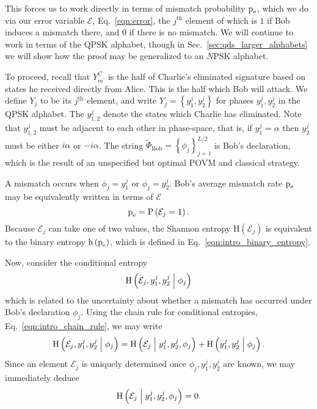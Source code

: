 This forces us to work directly in terms of mismatch probability $\text{p}_{\text{e}}$, which we do via our error variable $\mathcal{E}$, Eq.~\ref{eqn:error}, the $j^{\text{th}}$ element of which is $1$ if Bob induces a mismatch there, and $0$ if there is no mismatch. We will continue to work in terms of the QPSK alphabet, though in Sec.~\ref{sec:qds_larger_alphabets} we will show how the proof may be generalized to an $N$PSK alphabet.

To proceed, recall that $Y_{m^\prime}^C$ is the half of Charlie's eliminated signature based on states he received directly from Alice. This is the half which Bob will attack. We define $Y_j$ to be its $j^{\text{th}}$ element, and write $Y_j = \left\{ y_1^j, y_2^j\right\}$ for phases $y_1^j, y_2^j$ in the QPSK alphabet. The $y_{1,2}^j$ denote the states which Charlie has eliminated. Note that $y_{1,2}^j$ must be adjacent to each other in phase-space, that is, if $y_1^j = \alpha$ then $y_2^j$ must be either $i \alpha$ or $- i \alpha$. The string $\tilde{\Phi}_{\text{Bob}} = \left\{\phi_j\right\}_{j=1}^{L/2}$ is Bob's declaration, which is the result of an unspecified but optimal POVM and classical strategy.

A mismatch occurs when $\phi_j = y_1^j$ or $\phi_j = y_2^j$. Bob's average mismatch rate $\text{p}_{\text{e}}$ may be equivalently written in terms of $\mathcal{E}$
\begin{equation}
\text{p}_{\text{e}} = \text{P}\left(\mathcal{E}_j = 1\right). \notag
\end{equation}
Because $\mathcal{E}_j$ can take one of two values, the Shannon entropy $\text{H}\left(\mathcal{E}_j\right)$ is equivalent to the binary entropy $\text{h}\left(\text{p}_{\text{e}}\right)$, which is defined in Eq.~\ref{eqn:intro_binary_entropy}. %

Now, consider the conditional entropy
\begin{equation}
\text{H}\left(\mathcal{E}_j, y_1^j, y_2^j \; \middle| \; \phi_j\right)
\end{equation}
which is related to the uncertainty about whether a mismatch has occurred under Bob's declaration $\phi_j$. Using the chain rule for conditional entropies, Eq.~\ref{eqn:intro_chain_rule}, we may write
\begin{equation}\label{eqn:qds_pe_deriv_1}
\text{H}\left( \mathcal{E}_j, y_1^j, y_2^j \; \middle| \; \phi_j \right) = 
\text{H}\left( \mathcal{E}_j \; \middle| \; y_1^j, y_2^j, \phi_j\right) + 
\text{H}\left( y_1^j, y_2^j \; \middle| \; \phi_j\right).
\end{equation}
Since an element $\mathcal{E}_j$ is uniquely determined once $\phi_j, y_1^j, y_2^j$ are known, we may immediately deduce
\begin{equation}
\text{H}\left( \mathcal{E}_j \; \middle| \; y_1^j, y_2^j, \phi_j\right) = 0. \notag
\end{equation}

